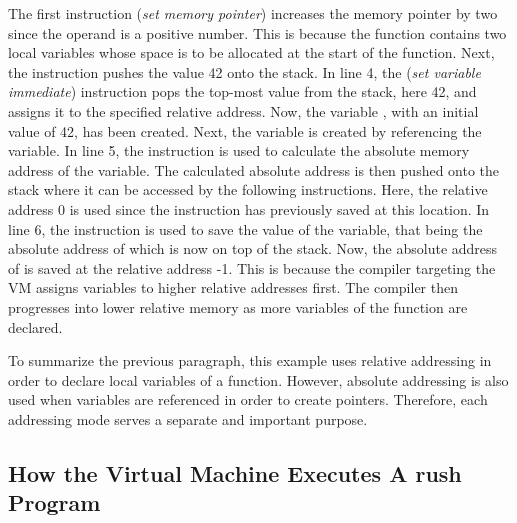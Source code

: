 
The first instruction  (\emph{set memory pointer}) increases the memory pointer by two since the operand is a positive number.
This is because the  function contains two local variables whose space is to be allocated at the start of the function.
Next, the  instruction pushes the value 42 onto the stack.
In line 4, the  (\emph{set variable immediate}) instruction pops the top-most value from the stack, here 42, and assigns it to the specified relative address.
Now, the variable , with an initial value of 42, has been created.
Next, the  variable is created by referencing the  variable.
In line 5, the  instruction is used to calculate the absolute memory address of the  variable.
The calculated absolute address is then pushed onto the stack where it can be accessed by the following instructions.
Here, the relative address 0 is used since the  instruction has previously saved  at this location.
In line 6, the  instruction is used to save the value of the  variable,
that being the absolute address of  which is now on top of the stack.
Now, the absolute address of  is saved at the relative address -1.
This is because the compiler targeting the VM assigns variables to higher relative addresses first.
The compiler then progresses into lower relative memory as more variables of the function are declared.

To summarize the previous paragraph, this example uses relative addressing in order to declare local variables of a function.
However, absolute addressing is also used when variables are referenced in order to create pointers.
Therefore, each addressing mode serves a separate and important purpose.

\subsection{How the Virtual Machine Executes A rush Program}


